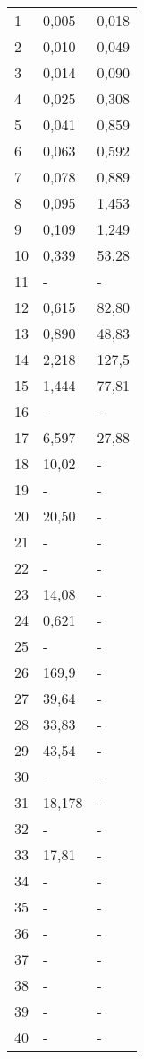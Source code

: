 \begin{center}
\begin{longtable}{|l|l|l|}
1 & 0,005 & 0,018 \\
2 & 0,010 & 0,049 \\
3 & 0,014 & 0,090 \\
4 & 0,025 & 0,308 \\
5 & 0,041 & 0,859 \\
6 & 0,063 & 0,592 \\
7 & 0,078 & 0,889 \\
8 & 0,095 & 1,453 \\
9 & 0,109 & 1,249 \\
10 & 0,339 & 53,28 \\
11 & - & - \\
12 & 0,615 & 82,80 \\
13 & 0,890 & 48,83 \\
14 & 2,218 & 127,5 \\
15 & 1,444 & 77,81 \\
16 & - & - \\
17 & 6,597 & 27,88 \\
18 & 10,02 & - \\
19 & - & - \\
20 & 20,50 & - \\
21 & - & - \\
22 & - & - \\
23 & 14,08 & - \\
24 & 0,621 & - \\
25 & - & - \\
26 & 169,9 & - \\
27 & 39,64 & - \\
28 & 33,83 & - \\
29 & 43,54 & - \\
30 & - & - \\
31 & 18,178 & - \\
32 & - & - \\
33 & 17,81 & - \\
34 & - & - \\
35 & - & - \\
36 & - & - \\
37 & - & - \\
38 & - & - \\
39 & - & - \\
40 & - & - \\
\end{longtable}
\end{center}